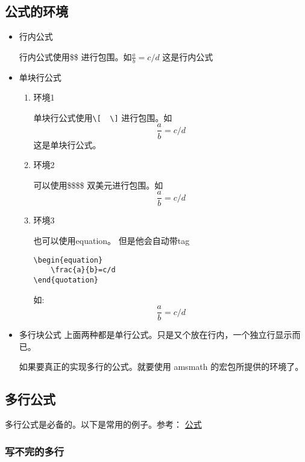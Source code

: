 \documentclass[utf-8,a4paper,11pt]{article}
\begin{document}
\subsection{公式的环境}
\begin{itemize}
    \item 行内公式

          行内公式使用\$\$ 进行包围。如$\frac{a}{b}=c/d$ 这是行内公式

    \item 单块行公式
          \begin{enumerate}
              \item 环境1

                    单块行公式使用\verb!\[  \]! 进行包围。如\[\frac{a}{b}=c/d\] 这是单块行公式。
              \item 环境2

                    可以使用\$\$\quad\$\$ 双美元进行包围。如 $$\frac{a}{b}=c/d$$
              \item 环境3

                    也可以使用equation。 但是他会自动带tag
                    \begin{lstlisting}
\begin{equation}
    \frac{a}{b}=c/d
\end{quotation}
                    \end{lstlisting}

                    如:
                    \begin{equation}
                        \frac{a}{b}=c/d
                    \end{equation}
          \end{enumerate}
    \item 多行块公式
          上面两种都是单行公式。只是又个放在行内，一个独立行显示而已。

          如果要真正的实现多行的公式。就要使用 amsmath 的宏包所提供的环境了。

\end{itemize}

\subsection{多行公式}

多行公式是必备的。以下是常用的例子。参考： \href{https://matnoble.me/tech/latex/multi-line-equations/}{公式}



\subsubsection{写不完的多行}
\end{document}
